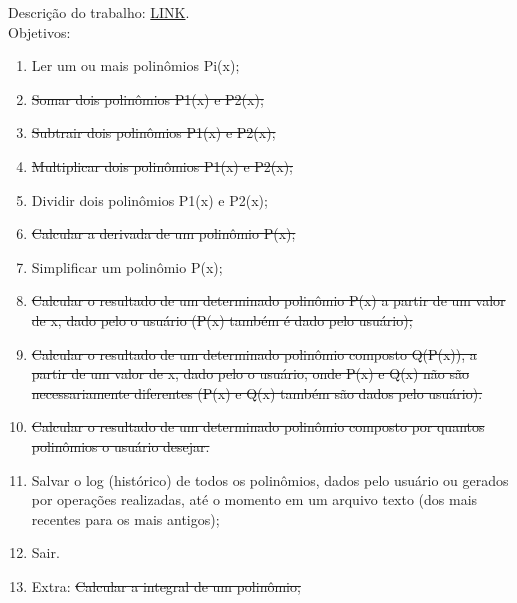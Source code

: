 \documentclass[a4paper]{article}
\begin{document}
Descrição do trabalho:
\href{https://sites.google.com/site/christianersbrasil/classroom-news/descricaodotrabalho-gbc024cacb}
{LINK}.\\

Objetivos:
\begin{enumerate}
\item Ler um ou mais polinômios Pi(x);
\item \sout{Somar dois polinômios P1(x) e P2(x);}
\item \sout{Subtrair dois polinômios P1(x) e P2(x);}
\item \sout{Multiplicar dois polinômios P1(x) e P2(x);}
\item Dividir dois polinômios P1(x) e P2(x);
\item \sout{Calcular a derivada de um polinômio P(x);}
\item Simplificar um polinômio P(x);
\item \sout{Calcular o resultado de um determinado polinômio P(x) a partir de um valor de x,
 dado pelo o usuário (P(x) também é dado pelo usuário);}
\item \sout{Calcular o resultado de um determinado polinômio composto Q(P(x)), a partir de 
um valor de x, dado pelo o usuário, onde P(x) e Q(x) não são necessariamente 
diferentes (P(x) e Q(x) também são dados pelo usuário).}
\item \sout{Calcular o resultado de um determinado polinômio composto por quantos 
polinômios o usuário desejar.}
\item Salvar o log (histórico) de todos os polinômios, dados pelo usuário ou gerados 
por operações realizadas, até o momento em um arquivo texto (dos mais 
recentes para os mais antigos);
\item Sair.
\item Extra: \sout{Calcular a integral de um polinômio;}
\end{enumerate}
\end{document}
